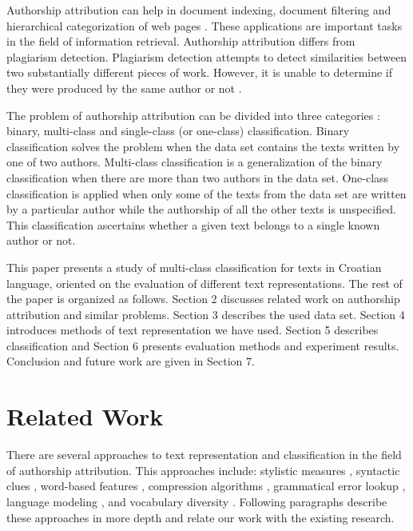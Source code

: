 \documentclass{llncs}
\begin{document}
Authorship attribution can help in document indexing, document filtering and
hierarchical categorization of web pages \cite{luyckx2005shallow}. These
applications are important tasks in the field of information retrieval. 
Authorship attribution differs from plagiarism detection. Plagiarism detection
attempts to detect similarities between two substantially different pieces of
work. However, it is unable to determine if they were produced by the same author or not
\cite{de2001mining}.

The problem of authorship attribution can be divided into three categories \cite{zhao2005effective}: binary,
multi-class and single-class (or one-class) classification. Binary classification 
solves the problem when the data set contains the texts written by one of two authors. Multi-class 
classification is a generalization of the binary classification when there are 
more than two authors in the data set. One-class classification
is applied when only some of the texts from the data set are written by a particular
author while the authorship of all the other texts is unspecified. This
classification ascertains whether a given text belongs to a single known author or not.

This paper presents a study of multi-class classification for texts in Croatian
language, oriented on the evaluation of different text representations. The rest of
the paper is organized as follows. Section 2 discusses related work on authorship
attribution and similar problems. Section 3 describes the used data set. Section
4 introduces methods of text representation we have used. Section 5 describes
classification and Section 6 presents evaluation methods and experiment results.
Conclusion and future work are given in Section 7.

\section{Related Work}
There are several approaches to text representation and classification in the field 
of authorship attribution. This approaches include: stylistic measures \cite{coyotl2006authorship}, syntactic clues
\cite{stamatatos2001computer,uzuner2005comparative}, word-based features
\cite{argamon2005measuring,uzuner2005comparative}, compression algorithms
\cite{kukushkina2001using,zhao2005effective}, grammatical error lookup
\cite{koppel2003exploiting}, language modeling
\cite{peng2003language,coyotl2006authorship}, and vocabulary diversity
\cite{stamatatos2001computer}. Following paragraphs describe these approaches in
more depth and relate our work with the existing research.
\end{document}
